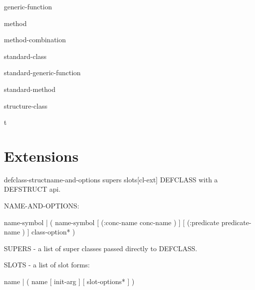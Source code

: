\documentclass[10pt,english]{book}
\begin{document}
\begin{class}{generic-function}{}
  
\end{class}

\begin{class}{method}{}
  
\end{class}

\begin{class}{method-combination}{}
  
\end{class}

\begin{class}{standard-class}{}
  
\end{class}

\begin{class}{standard-generic-function}{}
  
\end{class}

\begin{class}{standard-method}{}
  
\end{class}

\begin{class}{structure-class}{}
  
\end{class}

\begin{class}{t}{}
  
\end{class}

\section{Extensions}
\label{sec:extensions}

\begin{macro}{defclass-struct}{name-and-options supers \rest slots}[cl-ext]
  DEFCLASS with a DEFSTRUCT api.

NAME-AND-OPTIONS:

  name-symbol |
  ( name-symbol [ (:conc-name conc-name ) ]
                [ (:predicate predicate-name ) ]
                class-option* )

SUPERS - a list of super classes passed directly to DEFCLASS.

SLOTS - a list of slot forms:

  name |
  ( name [ init-arg ] [ slot-options* ] )
\end{macro}
\end{document}
